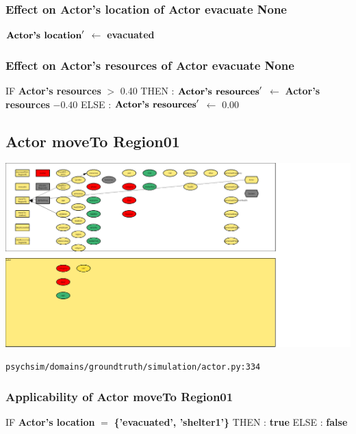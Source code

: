 \documentclass{article}%
\begin{document}
%
\subsubsection{Effect on Actor's location of Actor evacuate None}%
\label{ssubsec:Effect on Actor's location of Actor evacuate None}%
\begin{flushleft}%
$\mbox{\textbf{Actor's location}} '$%
$\leftarrow$%
\textbf{evacuated}%
\end{flushleft}

%
\subsubsection{Effect on Actor's resources of Actor evacuate None}%
\label{ssubsec:Effect on Actor's resources of Actor evacuate None}%
\begin{flushleft}%
IF %
\textbf{Actor's resources}%
$>$%
0.40%
\linebreak%
\hspace*{2em}%
THEN %
: %
$\mbox{\textbf{Actor's resources}} '$%
$\leftarrow$%
\textbf{Actor's resources}%
${-}0.40$%
\linebreak%
\hspace*{2em}%
ELSE %
: %
$\mbox{\textbf{Actor's resources}} '$%
$\leftarrow$%
0.00%
\end{flushleft}

%
\subsection{Actor moveTo Region01}%
\label{subsec:Actor moveTo Region01}%
\includegraphics[width=\textwidth]{images/Actor-moveTo-Region01.png}%
\begin{flushleft}%
\verb|psychsim/domains/groundtruth/simulation/actor.py:334|%
\end{flushleft}%
\subsubsection{Applicability of Actor moveTo Region01}%
\label{ssubsec:Applicability of Actor moveTo Region01}%
\begin{flushleft}%
IF %
\textbf{Actor's location}%
$=$%
\textbf{\{'evacuated', 'shelter1'\}}%
\linebreak%
\hspace*{2em}%
THEN %
: %
\textbf{true}%
\linebreak%
\hspace*{2em}%
ELSE %
: %
\textbf{false}%
\end{flushleft}
\end{document}
